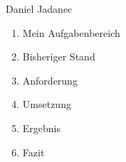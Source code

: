 \begin{frame}
	\begin{center}
		\Huge Daniel Jadanec
	\end{center}
\end{frame}

\begin{frame}
	 \begin{enumerate}
		 \item Mein Aufgabenbereich
		 \item Bisheriger Stand
		 \item Anforderung
		 \item Umsetzung
		 \item Ergebnis
		 \item Fazit
	\end{enumerate}
\end{frame}

